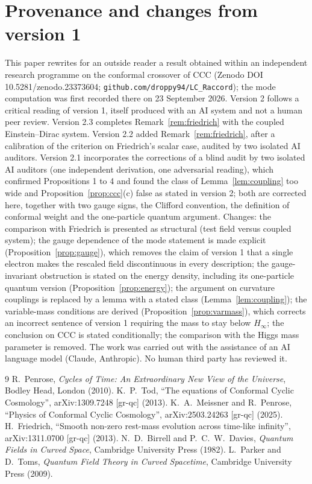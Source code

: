 \documentclass[11pt,a4paper]{article}
\theoremstyle{definition}
\begin{document}
\section*{Provenance and changes from version 1}
This paper rewrites for an outside reader a result obtained within an independent research programme on the conformal crossover of CCC (Zenodo DOI 10.5281/zenodo.23373604; \texttt{github.com/droppy94/LC\_Raccord}); the mode computation was first recorded there on 23 September 2026. Version 2 follows a critical reading of version 1, itself produced with an AI system and not a human peer review. Version 2.3 completes Remark~\ref{rem:friedrich} with the coupled Einstein--Dirac system. Version 2.2 added Remark~\ref{rem:friedrich}, after a calibration of the criterion on Friedrich's scalar case, audited by two isolated AI auditors. Version 2.1 incorporates the corrections of a blind audit by two isolated AI auditors (one independent derivation, one adversarial reading), which confirmed Propositions 1 to 4 and found the class of Lemma~\ref{lem:coupling} too wide and Proposition~\ref{prop:ccc}(c) false as stated in version 2; both are corrected here, together with two gauge signs, the Clifford convention, the definition of conformal weight and the one-particle quantum argument. Changes: the comparison with Friedrich is presented as structural (test field versus coupled system); the gauge dependence of the mode statement is made explicit (Proposition~\ref{prop:gauge}), which removes the claim of version 1 that a single electron makes the rescaled field discontinuous in every description; the gauge-invariant obstruction is stated on the energy density, including its one-particle quantum version (Proposition~\ref{prop:energy}); the argument on curvature couplings is replaced by a lemma with a stated class (Lemma~\ref{lem:coupling}); the variable-mass conditions are derived (Proposition~\ref{prop:varmass}), which corrects an incorrect sentence of version 1 requiring the mass to stay below $H_{\infty}$; the conclusion on CCC is stated conditionally; the comparison with the Higgs mass parameter is removed. The work was carried out with the assistance of an AI language model (Claude, Anthropic). No human third party has reviewed it.

\begin{thebibliography}{9}
 R.~Penrose, \emph{Cycles of Time: An Extraordinary New View of the Universe}, Bodley Head, London (2010).
 K.~P.~Tod, ``The equations of Conformal Cyclic Cosmology'', arXiv:1309.7248 [gr-qc] (2013).
 K.~A.~Meissner and R.~Penrose, ``Physics of Conformal Cyclic Cosmology'', arXiv:2503.24263 [gr-qc] (2025).
 H.~Friedrich, ``Smooth non-zero rest-mass evolution across time-like infinity'', arXiv:1311.0700 [gr-qc] (2013).
 N.~D.~Birrell and P.~C.~W.~Davies, \emph{Quantum Fields in Curved Space}, Cambridge University Press (1982).
 L.~Parker and D.~Toms, \emph{Quantum Field Theory in Curved Spacetime}, Cambridge University Press (2009).
\end{thebibliography}
\end{document}
